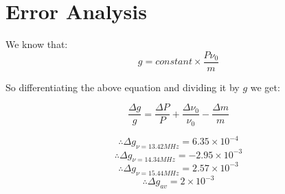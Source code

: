 \section{Error Analysis}

    We know that:
    $$g = constant\times\frac{P\nu_0}{m}$$

    So differentiating the above equation and dividing it by $g$ we get:

    $$\frac{\Delta g}{g} = \frac{\Delta P}{P} + \frac{\Delta \nu_0}{\nu_0} - \frac{\Delta m}{m}$$

    $$\therefore \Delta g_{\nu = 13.42MHz} = 6.35\times 10^{-4}$$
    $$\therefore \Delta g_{\nu = 14.34MHz} = -2.95\times 10^{-3}$$
    $$\therefore \Delta g_{\nu = 15.44MHz} = 2.57\times 10^{-3}$$
    $$\therefore \Delta g_{av} = 2\times10^{-3}$$

    \begin{center}\end{center}